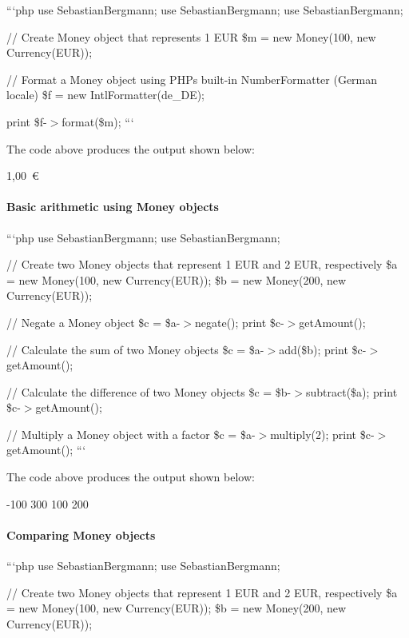 ```php use Sebastian\+Bergmann; use Sebastian\+Bergmann; use Sebastian\+Bergmann;

// Create Money object that represents 1 E\+U\+R \$m = new Money(100, new Currency(\textquotesingle{}E\+U\+R\textquotesingle{}));

// Format a Money object using P\+H\+P\textquotesingle{}s built-\/in Number\+Formatter (German locale) \$f = new Intl\+Formatter(\textquotesingle{}de\+\_\+\+D\+E\textquotesingle{});

print \$f-\/$>$format(\$m); ```

The code above produces the output shown below\+: \begin{DoxyVerb}1,00 €
\end{DoxyVerb}


\paragraph*{Basic arithmetic using Money objects}

```php use Sebastian\+Bergmann; use Sebastian\+Bergmann;

// Create two Money objects that represent 1 E\+U\+R and 2 E\+U\+R, respectively \$a = new Money(100, new Currency(\textquotesingle{}E\+U\+R\textquotesingle{})); \$b = new Money(200, new Currency(\textquotesingle{}E\+U\+R\textquotesingle{}));

// Negate a Money object \$c = \$a-\/$>$negate(); print \$c-\/$>$get\+Amount();

// Calculate the sum of two Money objects \$c = \$a-\/$>$add(\$b); print \$c-\/$>$get\+Amount();

// Calculate the difference of two Money objects \$c = \$b-\/$>$subtract(\$a); print \$c-\/$>$get\+Amount();

// Multiply a Money object with a factor \$c = \$a-\/$>$multiply(2); print \$c-\/$>$get\+Amount(); ```

The code above produces the output shown below\+: \begin{DoxyVerb}-100
300
100
200
\end{DoxyVerb}


\paragraph*{Comparing Money objects}

```php use Sebastian\+Bergmann; use Sebastian\+Bergmann;

// Create two Money objects that represent 1 E\+U\+R and 2 E\+U\+R, respectively \$a = new Money(100, new Currency(\textquotesingle{}E\+U\+R\textquotesingle{})); \$b = new Money(200, new Currency(\textquotesingle{}E\+U\+R\textquotesingle{}));

